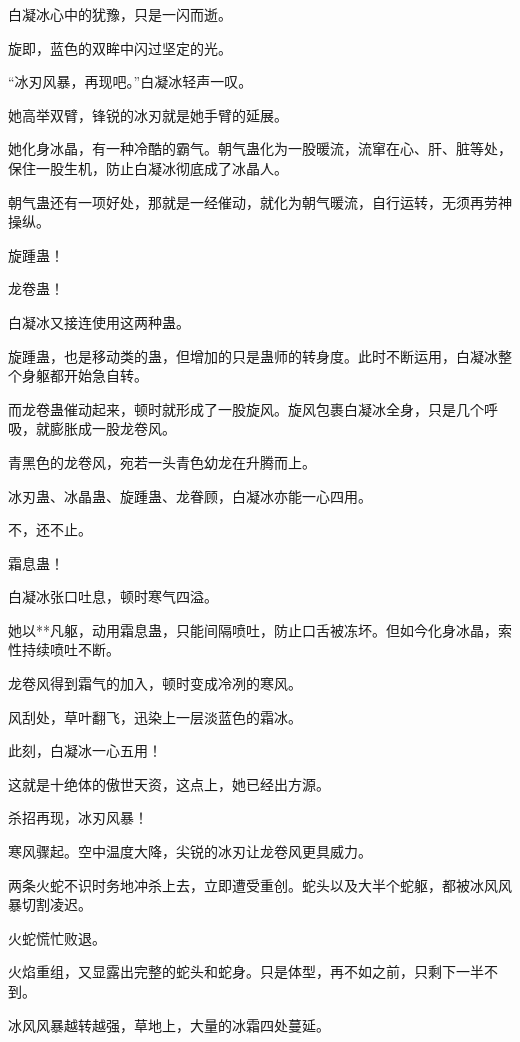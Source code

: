
\begin{this_body}

白凝冰心中的犹豫，只是一闪而逝。

旋即，蓝色的双眸中闪过坚定的光。

“冰刃风暴，再现吧。”白凝冰轻声一叹。

她高举双臂，锋锐的冰刃就是她手臂的延展。

她化身冰晶，有一种冷酷的霸气。朝气蛊化为一股暖流，流窜在心、肝、脏等处，保住一股生机，防止白凝冰彻底成了冰晶人。

朝气蛊还有一项好处，那就是一经催动，就化为朝气暖流，自行运转，无须再劳神操纵。

旋踵蛊！

龙卷蛊！

白凝冰又接连使用这两种蛊。

旋踵蛊，也是移动类的蛊，但增加的只是蛊师的转身度。此时不断运用，白凝冰整个身躯都开始急自转。

而龙卷蛊催动起来，顿时就形成了一股旋风。旋风包裹白凝冰全身，只是几个呼吸，就膨胀成一股龙卷风。

青黑色的龙卷风，宛若一头青色幼龙在升腾而上。

冰刃蛊、冰晶蛊、旋踵蛊、龙眷顾，白凝冰亦能一心四用。

不，还不止。

霜息蛊！

白凝冰张口吐息，顿时寒气四溢。

她以**凡躯，动用霜息蛊，只能间隔喷吐，防止口舌被冻坏。但如今化身冰晶，索性持续喷吐不断。

龙卷风得到霜气的加入，顿时变成冷冽的寒风。

风刮处，草叶翻飞，迅染上一层淡蓝色的霜冰。

此刻，白凝冰一心五用！

这就是十绝体的傲世天资，这点上，她已经出方源。

杀招再现，冰刃风暴！

寒风骤起。空中温度大降，尖锐的冰刃让龙卷风更具威力。

两条火蛇不识时务地冲杀上去，立即遭受重创。蛇头以及大半个蛇躯，都被冰风风暴切割凌迟。

火蛇慌忙败退。

火焰重组，又显露出完整的蛇头和蛇身。只是体型，再不如之前，只剩下一半不到。

冰风风暴越转越强，草地上，大量的冰霜四处蔓延。


\end{this_body}
